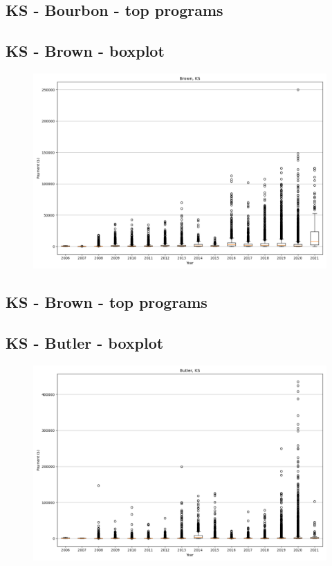 \subsection*{KS - Bourbon - top programs}

\newpage
\subsection*{KS - Brown - boxplot}
\begin{figure}[h]
\centering
\includegraphics[width=7in]{../output/boxplots/counties/Brown-KS_boxplot.png}
\end{figure}


\subsection*{KS - Brown - top programs}

\newpage
\subsection*{KS - Butler - boxplot}
\begin{figure}[h]
\centering
\includegraphics[width=7in]{../output/boxplots/counties/Butler-KS_boxplot.png}
\end{figure}


